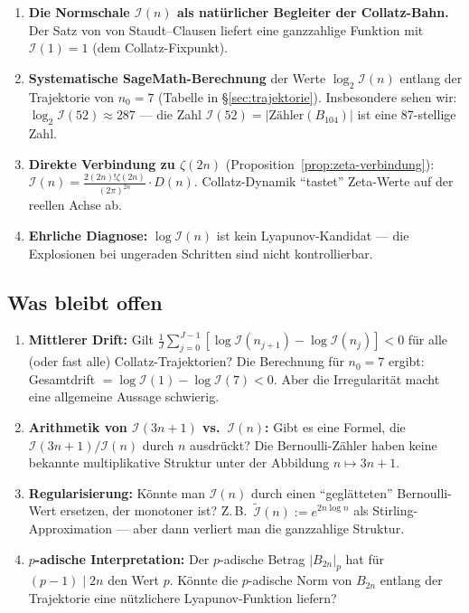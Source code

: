 \documentclass[12pt,a4paper]{article}
\newcommand{\abs}[1]{\lvert#1\rvert}
\newcommand{\In}{\mathcal{I}}      %
\newcommand{\Denom}[1]{D(#1)}     %
\begin{document}
\begin{tcolorbox}[bernoulli, title={Neue Beobachtungen}]
\begin{enumerate}[leftmargin=*, noitemsep, label=(\arabic*)]
  \item \textbf{Die Normschale $\In(n)$ als natürlicher Begleiter der Collatz-Bahn.}
        Der Satz von von Staudt--Clausen liefert eine ganzzahlige Funktion mit
        $\In(1) = 1$ (dem Collatz-Fixpunkt).
  \item \textbf{Systematische SageMath-Berechnung} der Werte $\log_2\In(n)$
        entlang der Trajektorie von $n_0 = 7$ (Tabelle in §\ref{sec:trajektorie}).
        Insbesondere sehen wir: $\log_2\In(52) \approx 287$ --- die Zahl
        $\In(52) = \abs{\text{Zähler}(B_{104})}$ ist eine 87-stellige Zahl.
  \item \textbf{Direkte Verbindung zu $\zeta(2n)$} (Proposition~\ref{prop:zeta-verbindung}):
        $\In(n) = \frac{2(2n)!\zeta(2n)}{(2\pi)^{2n}}\cdot\Denom{n}$.
        Collatz-Dynamik ``tastet'' Zeta-Werte auf der reellen Achse ab.
  \item \textbf{Ehrliche Diagnose:} $\log\In(n)$ ist kein Lyapunov-Kandidat
        --- die Explosionen bei ungeraden Schritten sind nicht kontrollierbar.
\end{enumerate}
\end{tcolorbox}

\subsection{Was bleibt offen}

\begin{tcolorbox}[lücke, title={Offene Fragen}]
\begin{enumerate}[leftmargin=*, label=(\arabic*)]
  \item \textbf{Mittlerer Drift:}
        Gilt $\frac{1}{J}\sum_{j=0}^{J-1}[\log\In(n_{j+1}) - \log\In(n_j)] < 0$
        für alle (oder fast alle) Collatz-Trajektorien?
        Die Berechnung für $n_0 = 7$ ergibt: Gesamtdrift $= \log\In(1) - \log\In(7) < 0$.
        Aber die Irregularität macht eine allgemeine Aussage schwierig.

  \item \textbf{Arithmetik von $\In(3n+1)$ vs.\ $\In(n)$:}
        Gibt es eine Formel, die $\In(3n+1)/\In(n)$ durch $n$ ausdrückt?
        Die Bernoulli-Zähler haben keine bekannte multiplikative Struktur unter
        der Abbildung $n \mapsto 3n+1$.

  \item \textbf{Regularisierung:}
        Könnte man $\In(n)$ durch einen ``geglätteten'' Bernoulli-Wert ersetzen,
        der monotoner ist? Z.\,B.\ $\tilde{\In}(n) := e^{2n\log n}$ als
        Stirling-Approximation --- aber dann verliert man die ganzzahlige Struktur.

  \item \textbf{$p$-adische Interpretation:}
        Der $p$-adische Betrag $|B_{2n}|_p$ hat für $(p-1)\mid 2n$ den Wert $p$.
        Könnte die $p$-adische Norm von $B_{2n}$ entlang der Trajektorie
        eine nützlichere Lyapunov-Funktion liefern?
\end{enumerate}
\end{tcolorbox}
\end{document}

